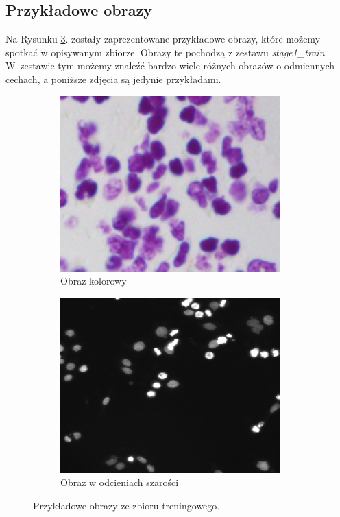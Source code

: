\documentclass[a4paper]{article}
\begin{document}
\subsection{Przykładowe obrazy}
Na Rysunku \ref{fig:examp1}. zostały zaprezentowane przykładowe obrazy, które możemy spotkać w opisywanym zbiorze. Obrazy te pochodzą z zestawu \textit{stage1\_train}. W~zestawie tym możemy znaleźć bardzo wiele różnych obrazów o odmiennych cechach, a poniższe zdjęcia są jedynie przykładami.\newline
\begin{figure}[h!]
\centering
\begin{subfigure}{.5\textwidth}
  \centering
  \includegraphics[width=.8\linewidth]{images/example_1.png}
  \caption{Obraz kolorowy}
  \label{fig:sub1}
\end{subfigure}%
\begin{subfigure}{.5\textwidth}
  \centering
  \includegraphics[width=.8\linewidth]{images/example_2.png}
  \caption{Obraz w odcieniach szarości}
  \label{fig:sub2}
\end{subfigure}
\caption{Przykładowe obrazy ze zbioru treningowego.}
\label{fig:examp1}
\end{figure}
\end{document}
